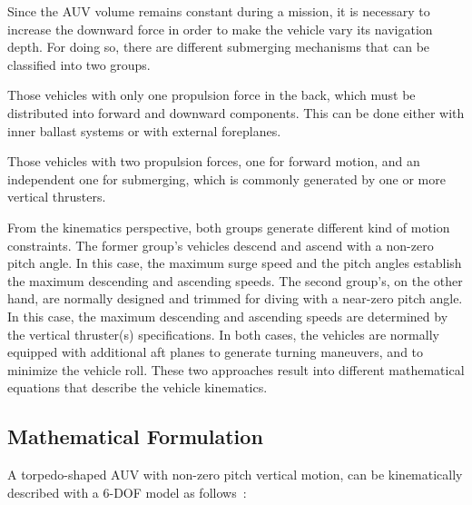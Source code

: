 Since the \ac{AUV} volume remains constant during a mission, it is necessary to
increase the downward force in order to make the vehicle vary its
navigation depth. For doing so, there are different submerging mechanisms that
can be classified into two groups. \begin{inparaenum}[1)]
\item Those vehicles with only one propulsion force in the back, which
must be distributed into forward and downward components. This can be done
either with inner ballast systems or with external foreplanes.
\item Those vehicles with two propulsion forces, one for forward motion, and an
independent one for submerging, which is commonly generated by one or more
vertical thrusters.
\end{inparaenum}

From the kinematics perspective, both groups generate different kind of motion
constraints. The former group's vehicles descend and ascend with a non-zero
pitch angle. In this case, the maximum surge speed and the pitch angles
establish the maximum descending and ascending speeds. The second group's, on
the other hand, are normally designed and trimmed for diving with a near-zero
pitch angle. In this case, the maximum descending and ascending speeds are
determined by the vertical thruster(s) specifications. In both cases, the
vehicles are normally equipped with additional aft planes to generate turning
maneuvers, and to minimize the vehicle roll. These two approaches result into
different mathematical equations that describe the vehicle kinematics.


\subsection{Mathematical Formulation}

A torpedo-shaped \ac{AUV} with non-zero pitch vertical motion, can be
kinematically described with a 6-\ac{DOF} model as follows~\cite{Wadoo2010}:

